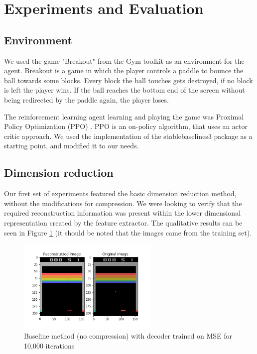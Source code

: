 \section{Experiments and Evaluation}
\subsection{Environment}
We used the game "Breakout" from the Gym toolkit \cite{brockman2016openai} as an
environment for the agent. Breakout is a game in which the player controls a
paddle to bounce the ball towards some blocks. Every block the ball touches gets
destroyed, if no block is left the player wins. If the ball reaches the bottom
end of the screen without being redirected by the paddle again, the player
loses.

The reinforcement learning agent learning and playing the game was Proximal
Policy Optimization (PPO) \cite{raffin2019stable}. PPO is an on-policy
algorithm, that uses an actor critic approach. We used the implementation of the
stablebaselines3 package \cite{raffin2019stable} as a starting point, and
modified it to our needs.

\subsection{Dimension reduction}
Our first set of experiments featured the basic dimension reduction method,
without the modifications for compression. We were looking to verify that the
required reconstruction information was present within the lower dimensional
representation created by the feature extractor. The qualitative results can be
seen in Figure \ref{fig:baseline_MSE} (it should be noted that the images came
from the training set). \\

\begin{figure}[H]
    \centering
    \includegraphics[width=0.6\textwidth]{images/orig_reconstructed0.0.png}
    \caption{Baseline method (no compression) with decoder trained on MSE for 10,000 iterations}
    \label{fig:baseline_MSE}
\end{figure}


